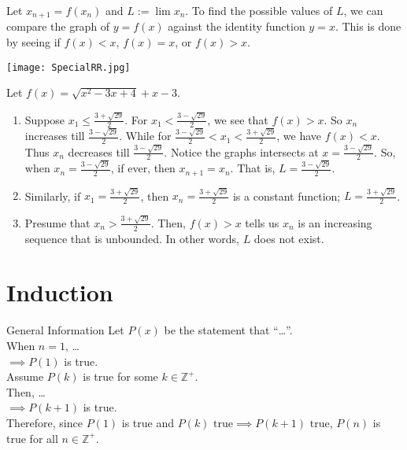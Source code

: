 \documentclass[oneside]{book}
\begin{document}
\begin{note}
  Let \(x_{n+1}=f(x_n)\) and \(L:=\lim{x_n}\). To find the possible values of \(L\), we can compare the graph of \(y=f(x)\) against the identity function \(y=x\). This is done by seeing if \(f(x)<x\), \(f(x)=x\), or \(f(x)>x\).
\end{note}
\begin{example}{}{}
  \begin{center}
    \texttt{[image: SpecialRR.jpg]}
  \end{center}
  Let \(f(x)=\sqrt{x^2-3x+4}+x-3\).
  \begin{enumerate}
    \item Suppose \(x_1 \leq \frac{3+\sqrt{29}}{2}\). For \(x_1<\frac{3-\sqrt{29}}{2}\), we see that \(f(x)>x\). So \(x_n\) increases till \(\frac{3-\sqrt{29}}{2}\). While for \(\frac{3-\sqrt{29}}{2}<x_1<\frac{3+\sqrt{29}}{2}\), we have \(f(x)<x\). Thus \(x_n\) decreases till \(\frac{3-\sqrt{29}}{2}\). Notice the graphs intersects at \(x=\frac{3-\sqrt{29}}{2}\). So, when \(x_n=\frac{3-\sqrt{29}}{2}\), if ever, then \(x_{n+1}=x_n\). That is, \(L=\frac{3-\sqrt{29}}{2}\).
    \item Similarly, if \(x_1=\frac{3+\sqrt{29}}{2}\), then \(x_n=\frac{3+\sqrt{29}}{2}\) is a constant function; \(L=\frac{3+\sqrt{29}}{2}\).
    \item Presume that \(x_n>\frac{3+\sqrt{29}}{2}\). Then, \(f(x)>x\) tells us \(x_n\) is an increasing sequence that is unbounded. In other words, \(L\) does not exist.
  \end{enumerate}
\end{example}

\chapter{Induction}
\begin{stbox}{General Information}
  Let \(P(x)\) be the statement that ``\ldots''.\\[3mm] 
  When \(n=1\), \ldots\\[3mm]
  \(\implies P(1)\) is true.\\[3mm]
  Assume \(P(k)\) is true for some \(k \in \mathbb{Z}^{+}\).\\[3mm]
  Then, \ldots\\[3mm]
  \(\implies P(k+1)\) is true.\\[3mm]
  Therefore, since \(P(1)\) is true and \(P(k)\text{ true}\implies P(k+1)\text{ true}\), \(P(n)\) is true for all \(n \in \mathbb{Z}^{+}\).
\end{stbox}
\end{document}
